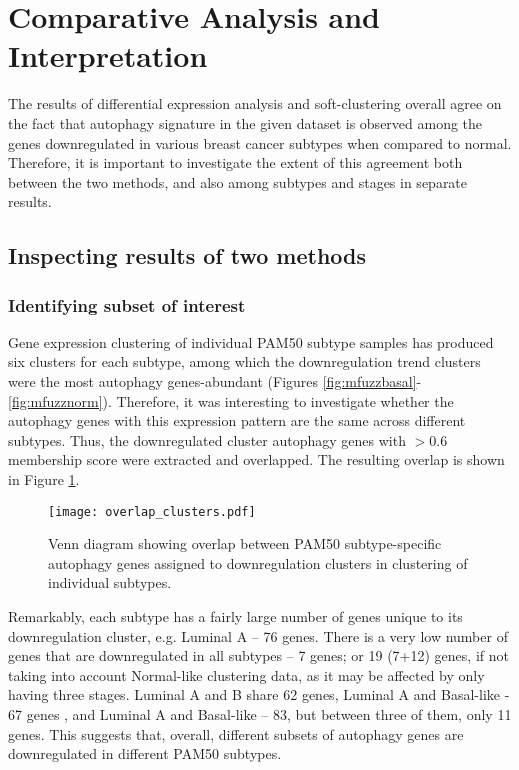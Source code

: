 \section{Comparative Analysis and Interpretation}

The results of differential expression analysis and soft-clustering overall agree on the fact that autophagy signature in the given dataset is observed among the genes downregulated in various breast cancer subtypes when compared to normal. Therefore, it is important to investigate the extent of this agreement both between the two methods, and also among subtypes and stages in separate results. 

\subsection{Inspecting results of two methods}

\subsubsection{Identifying subset of interest}

Gene expression clustering of individual PAM50 subtype samples has produced six clusters for each subtype, among which the downregulation trend clusters were the most autophagy genes-abundant (Figures \ref{fig:mfuzzbasal}-\ref{fig:mfuzznorm}). Therefore, it was interesting to investigate whether the autophagy genes with this expression pattern are the same across different subtypes. Thus, the downregulated cluster autophagy genes with $>0.6$ membership score were extracted and overlapped. The resulting overlap is shown in Figure \ref{fig:overlapclusters}. \\

            \begin{figure}[!h]
            \centering
            \texttt{[image: overlap\_clusters.pdf]} 
            \caption[Overlap between PAM50 subtype-specific downregulation cluster autophagy genes]{Venn diagram showing overlap between PAM50 subtype-specific autophagy genes assigned to downregulation clusters in clustering of individual subtypes.}
            \label{fig:overlapclusters}
            \end{figure}
            
Remarkably, each subtype has a fairly large number of  genes unique to its downregulation cluster, e.g. Luminal A -- 76 genes. There is a very low number of genes that are downregulated in all subtypes -- 7 genes; or 19 (7+12) genes, if not taking into account Normal-like clustering data, as it may be affected by only having three stages. Luminal A and B share 62 genes, Luminal A and Basal-like - 67 genes , and Luminal A and Basal-like -- 83, but between three of them, only 11 genes. This suggests that, overall, different subsets of autophagy genes are downregulated in different PAM50 subtypes. 



